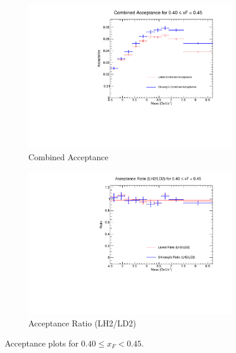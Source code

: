 \documentclass[11pt]{article}
\begin{document}
\begin{figure}[p]
\begin{subfigure}[b]{0.48\textwidth}
       \includegraphics[width=\linewidth]{./acceptancePlots/Combined_acceptance_xF_bin_8.pdf}
       \caption{Combined Acceptance}
    \end{subfigure}\hfill
    \begin{subfigure}[b]{0.48\textwidth}
       \includegraphics[width=\linewidth]{./acceptancePlots/Acceptance_ratio_xF_bin_8.pdf}
       \caption{Acceptance Ratio (LH2/LD2)}
    \end{subfigure}
    \caption{Acceptance plots for $0.40 \le x_F < 0.45$.}
\end{figure}
\end{document}

